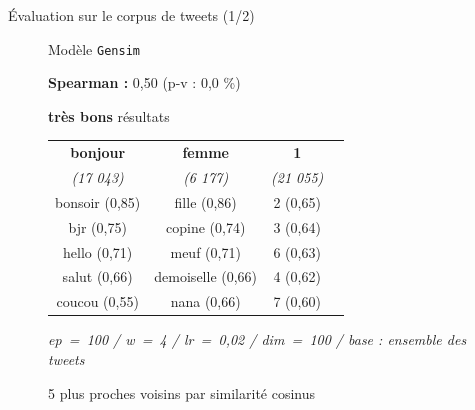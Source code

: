 \documentclass[10pt,xcolor=table,color={dvipsnames,usenames},ignorenonframetext,usepdftitle=false,french]{beamer}
\begin{document}
\begin{frame}{Évaluation sur le corpus de tweets (1/2)}
\begin{figure}
\begin{minipage}{.6\textwidth}
\end{minipage}
\end{figure}

\pause

\bigskip

\begin{figure}
\begin{minipage}{.4\textwidth}

Modèle \texttt{Gensim}

\medskip

\footnotesize
\textbf{ Spearman : } 0,50 (p-v : 0,0 \%)
\normalsize

\medskip

\faArrowCircleRight{} \textbf{très bons} résultats

\end{minipage}%
\begin{minipage}{.6\textwidth}
\footnotesize

\begin{table}[h]
\begin{center}
\begin{tabular}{|c|c|c|c|}
    \hline
\textbf{bonjour} & \textbf{femme} & \textbf{1} \tabularnewline
\emph{(17 043)} & \emph{(6 177)} & \emph{(21 055)} \tabularnewline
       \hline
bonsoir (0,85) & fille (0,86) & 2 (0,65)  \tabularnewline
bjr (0,75) & copine (0,74) & 3 (0,64) \tabularnewline
hello (0,71) & meuf (0,71) & 6 (0,63) \tabularnewline
salut (0,66) & demoiselle (0,66) & 4 (0,62) \tabularnewline
coucou (0,55) & nana (0,66) & 7 (0,60) \tabularnewline
    \hline
 \end{tabular}
\captionsetup{margin=0cm,format=hang,justification=justified}
\end{center}
\tiny
\emph{ep = 100 / w = 4 / lr = 0,02 / dim = 100 / base : ensemble des tweets}

\medskip

\footnotesize{5 plus proches voisins par similarité cosinus}
\end{table}

\normalsize

\end{minipage}
\end{figure}

\end{frame}
\end{document}
